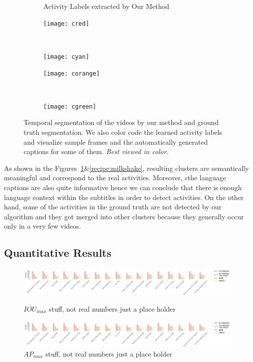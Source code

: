 \begin{figure}
\begin{subfigure}[b]{0.5\textwidth}
\caption{Activity Labels extracted by Our Method}
\end{subfigure}
\begin{subfigure}[b]{0.25\textwidth}
\texttt{[image: cred]}
\color[HTML]{FF3800}{Crack the eggs one at a time into a bowl.}
\end{subfigure}~
\begin{subfigure}[b]{0.25\textwidth}
\texttt{[image: cyan]}
\color[HTML]{00FFED}{Remove the omelette onto a plate.}
\end{subfigure}
\begin{subfigure}[b]{0.25\textwidth}
\texttt{[image: corange]}
\color[HTML]{FF9900}{You can either use a fork or wire whisk to beat the eggs into a bowl.}
\end{subfigure}~
\begin{subfigure}[b]{0.25\textwidth}
\texttt{[image: cgreen]}
\color[HTML]{9DFF00}{Eggs cook quickly, so make sure the pan gets very hot first; the butter melt completely.}
\end{subfigure}
\caption{Temporal segmentation of the videos by our method and ground truth segmentation. We also color code the learned activity labels and visualize sample frames and the automatically generated captions for some of them. \emph{Best viewed in color.}}
\label{recipe:ommelette}
\fi
\end{figure}

As shown in the Figures~\ref{recipe:ommelette}\&\ref{recipe:milkshake}, resulting clusters are semantically meaningful and correspond to the real activities. Moreover, sthe language captions are also quite informative hence we can conclude that there is enough language context within the subtitles in order to detect activities. On the other hand, some of the activities in the ground truth are not detected by our algorithm and they got merged into other clusters because they generally occur only in a very few videos.
\subsection{Quantitative Results}
\begin{figure}[t]
  \includegraphics[width=\textwidth]{miou}
  \caption{$IOU_{max}$ stuff, not real numbers just a place holder}
  \label{mIOU}
\includegraphics[width=\textwidth]{miou}
\caption{$AP_{max}$ stuff, not real numbers just a place holder}
\label{mmAP}
\end{figure}

